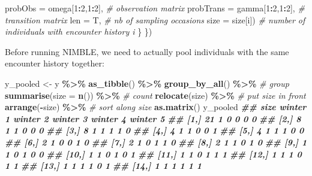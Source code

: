 \documentclass[
  12pt,
]{krantz}
\newenvironment{Shaded}{\begin{snugshade}}{\end{snugshade}}
\newcommand{\AttributeTok}[1]{\textcolor[rgb]{0.13,0.29,0.53}{#1}}
\newcommand{\CommentTok}[1]{\textcolor[rgb]{0.56,0.35,0.01}{\textit{#1}}}
\newcommand{\DecValTok}[1]{\textcolor[rgb]{0.00,0.00,0.81}{#1}}
\newcommand{\DocumentationTok}[1]{\textcolor[rgb]{0.56,0.35,0.01}{\textbf{\textit{#1}}}}
\newcommand{\FunctionTok}[1]{\textcolor[rgb]{0.13,0.29,0.53}{\textbf{#1}}}
\newcommand{\NormalTok}[1]{#1}
\newcommand{\OtherTok}[1]{\textcolor[rgb]{0.56,0.35,0.01}{#1}}
\newcommand{\SpecialCharTok}[1]{\textcolor[rgb]{0.81,0.36,0.00}{\textbf{#1}}}
\begin{document}
\begin{Shaded}
\begin{Highlighting}[]
                          \AttributeTok{probObs =}\NormalTok{ omega[}\DecValTok{1}\SpecialCharTok{:}\DecValTok{2}\NormalTok{,}\DecValTok{1}\SpecialCharTok{:}\DecValTok{2}\NormalTok{], }\CommentTok{\# observation matrix}
                          \AttributeTok{probTrans =}\NormalTok{ gamma[}\DecValTok{1}\SpecialCharTok{:}\DecValTok{2}\NormalTok{,}\DecValTok{1}\SpecialCharTok{:}\DecValTok{2}\NormalTok{], }\CommentTok{\# transition matrix}
                          \AttributeTok{len =}\NormalTok{ T, }\CommentTok{\# nb of sampling occasions}
                          \AttributeTok{size =}\NormalTok{ size[i]) }\CommentTok{\# number of individuals with encounter history i}
\NormalTok{  \}}
\NormalTok{\})}
\end{Highlighting}
\end{Shaded}

Before running NIMBLE, we need to actually pool individuals with the same encounter history together:

\begin{Shaded}
\begin{Highlighting}[]
\NormalTok{y\_pooled }\OtherTok{\textless{}{-}}\NormalTok{ y }\SpecialCharTok{\%\textgreater{}\%} 
  \FunctionTok{as\_tibble}\NormalTok{() }\SpecialCharTok{\%\textgreater{}\%} 
  \FunctionTok{group\_by\_all}\NormalTok{() }\SpecialCharTok{\%\textgreater{}\%} \CommentTok{\# group}
  \FunctionTok{summarise}\NormalTok{(}\AttributeTok{size =} \FunctionTok{n}\NormalTok{()) }\SpecialCharTok{\%\textgreater{}\%} \CommentTok{\# count}
  \FunctionTok{relocate}\NormalTok{(size) }\SpecialCharTok{\%\textgreater{}\%} \CommentTok{\# put size in front}
  \FunctionTok{arrange}\NormalTok{(}\SpecialCharTok{{-}}\NormalTok{size) }\SpecialCharTok{\%\textgreater{}\%} \CommentTok{\# sort along size}
  \FunctionTok{as.matrix}\NormalTok{()}
\NormalTok{y\_pooled}
\DocumentationTok{\#\#       size winter 1 winter 2 winter 3 winter 4 winter 5}
\DocumentationTok{\#\#  [1,]   21        1        0        0        0        0}
\DocumentationTok{\#\#  [2,]    8        1        1        0        0        0}
\DocumentationTok{\#\#  [3,]    8        1        1        1        1        0}
\DocumentationTok{\#\#  [4,]    4        1        1        0        0        1}
\DocumentationTok{\#\#  [5,]    4        1        1        1        0        0}
\DocumentationTok{\#\#  [6,]    2        1        0        0        1        0}
\DocumentationTok{\#\#  [7,]    2        1        0        1        1        0}
\DocumentationTok{\#\#  [8,]    2        1        1        0        1        0}
\DocumentationTok{\#\#  [9,]    1        1        0        1        0        0}
\DocumentationTok{\#\# [10,]    1        1        0        1        0        1}
\DocumentationTok{\#\# [11,]    1        1        0        1        1        1}
\DocumentationTok{\#\# [12,]    1        1        1        0        1        1}
\DocumentationTok{\#\# [13,]    1        1        1        1        0        1}
\DocumentationTok{\#\# [14,]    1        1        1        1        1        1}
\end{Highlighting}
\end{Shaded}
\end{document}
